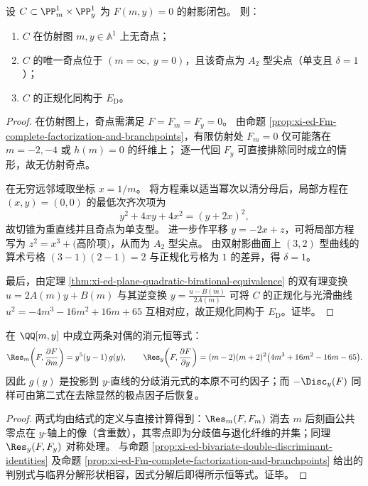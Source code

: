 \begin{proposition}\label{prop:xi-ed-plane-curve-unique-cusp-and-normalization}
设 \(C\subset \PP^1_m\times \PP^1_y\) 为 \(F(m,y)=0\) 的射影闭包。
则：
\begin{enumerate}
  \item \(C\) 在仿射图 \(m,y\in\mathbb{A}^1\) 上无奇点；
  \item \(C\) 的唯一奇点位于 \((m=\infty,\ y=0)\)，且该奇点为 \(A_2\) 型尖点（单支且 \(\delta=1\)）；
  \item \(C\) 的正规化同构于 \(E_{\mathrm D}\)。
\end{enumerate}
\end{proposition}
\begin{proof}
在仿射图上，奇点需满足 \(F=F_m=F_y=0\)。
由命题 \ref{prop:xi-ed-Fm-complete-factorization-and-branchpoints}，有限仿射处 \(F_m=0\) 仅可能落在 \(m=-2,-4\) 或 \(h(m)=0\) 的纤维上；
逐一代回 \(F_y\) 可直接排除同时成立的情形，故无仿射奇点。
\par
在无穷远邻域取坐标 \(x=1/m\)。
将方程乘以适当幂次以清分母后，局部方程在 \((x,y)=(0,0)\) 的最低次齐次项为
\[
y^2+4xy+4x^2=(y+2x)^2,
\]
故切锥为重直线并且奇点为单支型。
进一步作平移 \(y=-2x+z\)，可将局部方程写为
\(
z^2=x^3+\text{(高阶项)}
\)，从而为 \(A_2\) 型尖点。
由双射影曲面上 \((3,2)\) 型曲线的算术亏格 \((3-1)(2-1)=2\) 与正规化亏格为 \(1\) 的差异，得 \(\delta=1\)。
\par
最后，由定理 \ref{thm:xi-ed-plane-quadratic-birational-equivalence} 的双有理变换 \(u=2A(m)y+B(m)\) 与其逆变换
\(
y=\frac{u-B(m)}{2A(m)}
\)
可将 \(C\) 的正规化与光滑曲线 \(u^2=-4m^3-16m^2+16m+65\) 互相对应，故正规化同构于 \(E_{\mathrm D}\)。证毕。
\end{proof}

\begin{proposition}[对偶消元恒等式与分歧不变量的内禀刻画]\label{prop:xi-ed-resultant-ramification-intrinsic}
在 \(\QQ[m,y]\) 中成立两条对偶的消元恒等式：
\[
\Res_m\!\left(F,\frac{\partial F}{\partial m}\right)=y^5(y-1)\,g(y),
\qquad
\Res_y\!\left(F,\frac{\partial F}{\partial y}\right)=(m-2)(m+2)^2\bigl(4m^3+16m^2-16m-65\bigr).
\]
因此 \(g(y)\) 是投影到 \(y\)-直线的分歧消元式的本原不可约因子；而 \(-\Disc_y(F)\) 同样可由第二式在去除显然的极点因子后恢复。
\end{proposition}
\begin{proof}
两式均由结式的定义与直接计算得到：\(\Res_m(F,F_m)\) 消去 \(m\) 后刻画公共零点在 \(y\)-轴上的像（含重数），其零点即为分歧值与退化纤维的并集；同理 \(\Res_y(F,F_y)\) 对称处理。
与命题 \ref{prop:xi-ed-bivariate-double-discriminant-identities} 及命题 \ref{prop:xi-ed-Fm-complete-factorization-and-branchpoints} 给出的判别式与临界分解形状相容，因式分解后即得所示恒等式。证毕。
\end{proof}

